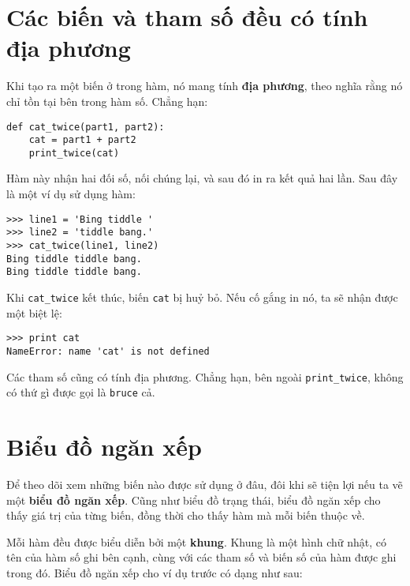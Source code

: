 \documentclass[11pt]{book}
\begin{document}
\section{Các biến và tham số đều có tính địa phương}

Khi tạo ra một biến ở trong hàm, nó mang tính {\bf địa phương},
theo nghĩa rằng nó chỉ tồn tại bên trong hàm số. Chẳng hạn:


\beforeverb
\begin{verbatim}
def cat_twice(part1, part2):
    cat = part1 + part2
    print_twice(cat)
\end{verbatim}
\afterverb
%
Hàm này nhận hai đối số, nối chúng lại, và sau đó in ra kết quả
hai lần. Sau đây là một ví dụ sử dụng hàm:


\beforeverb
\begin{verbatim}
>>> line1 = 'Bing tiddle '
>>> line2 = 'tiddle bang.'
>>> cat_twice(line1, line2)
Bing tiddle tiddle bang.
Bing tiddle tiddle bang.
\end{verbatim}
\afterverb
%
Khi \verb"cat_twice" kết thúc, biến {\tt cat} bị huỷ bỏ.
Nếu cố gắng in nó, ta sẽ nhận được một biệt lệ:


\beforeverb
\begin{verbatim}
>>> print cat
NameError: name 'cat' is not defined
\end{verbatim}
\afterverb
%
Các tham số cũng có tính địa phương.
Chẳng hạn, bên ngoài \verb"print_twice", không có thứ
gì được gọi là {\tt bruce} cả.



\section{Biểu đồ ngăn xếp}

Để theo dõi xem những biến nào được sử dụng ở đâu, đôi khi sẽ tiện lợi
nếu ta vẽ một {\bf biểu đồ ngăn xếp}. Cũng như biểu đồ trạng thái, 
biểu đồ ngăn xếp cho thấy giá trị của từng biến, đồng thời cho thấy
hàm mà mỗi biến thuộc về.


Mỗi hàm đều được biểu diễn bởi một {\bf khung}. Khung là một hình
chữ nhật, có tên của hàm số ghi bên cạnh, cùng với các tham số và biến
số của hàm được ghi trong đó. Biểu đồ ngăn xếp cho ví dụ trước có dạng
như sau:
\end{document}

